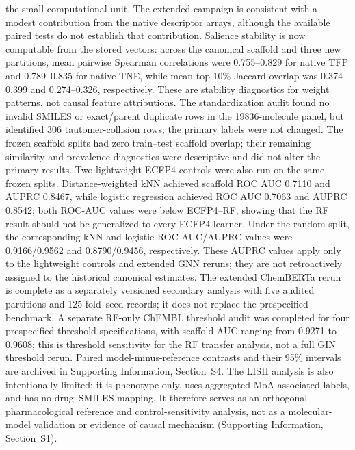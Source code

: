\documentclass[11pt,a4paper]{article}
\begin{document}
the small computational unit. The extended campaign is consistent with a modest contribution from the native descriptor arrays, although the available paired tests do not establish that contribution. Salience stability is now computable from the stored vectors: across the canonical scaffold and three new partitions, mean pairwise Spearman correlations were \num{0.755}--\num{0.829} for native TFP and \num{0.789}--\num{0.835} for native TNE, while mean top-10\% Jaccard overlap was \num{0.374}--\num{0.399} and \num{0.274}--\num{0.326}, respectively. These are stability diagnostics for weight patterns, not causal feature attributions. The standardization audit found no invalid SMILES or exact/parent duplicate rows in the \num{19836}-molecule panel, but identified \num{306} tautomer-collision rows; the primary labels were not changed. The frozen scaffold splits had zero train--test scaffold overlap; their remaining similarity and prevalence diagnostics were descriptive and did not alter the primary results. Two lightweight ECFP4 controls were also run on the same frozen splits. Distance-weighted kNN achieved scaffold ROC AUC \num{0.7110} and AUPRC \num{0.8467}, while logistic regression achieved ROC AUC \num{0.7063} and AUPRC \num{0.8542}; both ROC-AUC values were below ECFP4--RF, showing that the RF result should not be generalized to every ECFP4 learner. Under the random split, the corresponding kNN and logistic ROC AUC/AUPRC values were \num{0.9166}/\num{0.9562} and \num{0.8790}/\num{0.9456}, respectively. These AUPRC values apply only to the lightweight controls and extended GNN reruns; they are not retroactively assigned to the historical canonical estimates. The extended ChemBERTa rerun is complete as a separately versioned secondary analysis with five audited partitions and 125 fold--seed records; it does not replace the prespecified benchmark. A separate RF-only ChEMBL threshold audit was completed for four prespecified threshold specifications, with scaffold AUC ranging from \num{0.9271} to \num{0.9608}; this is threshold sensitivity for the RF transfer analysis, not a full GIN threshold rerun. Paired model-minus-reference contrasts and their 95\% intervals are archived in Supporting Information, Section~S4. The LISH analysis is also intentionally limited: it is phenotype-only, uses aggregated MoA-associated labels, and has no drug--SMILES mapping. It therefore serves as an orthogonal pharmacological reference and control-sensitivity analysis, not as a molecular-model validation or evidence of causal mechanism (Supporting Information, Section~S1).
\end{document}
